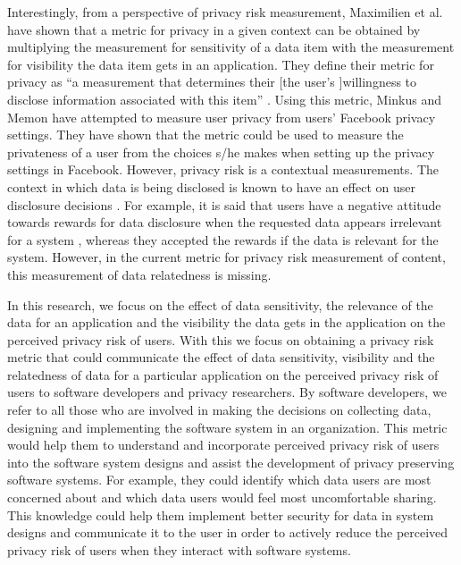 \documentclass[conference]{IEEEtran}
\begin{document}
Interestingly, from a perspective of privacy risk measurement, Maximilien et al. \cite {maximilien2009privacy} have shown that a metric for privacy in a given context can be obtained by multiplying the measurement for sensitivity of a data item with the measurement for visibility the data item gets in an application. They define their metric for privacy as \enquote{a measurement that determines their [the user's ]willingness to disclose information associated with this item} \cite {maximilien2009privacy}. Using this metric, Minkus and Memon \cite{minkus2014scale} have attempted to measure user privacy from users' Facebook privacy settings. They have shown that the metric could be used to measure the privateness of a user from the choices s/he makes when setting up the privacy settings in Facebook. However, privacy risk is a contextual measurements. The context in which data is being disclosed \cite {nissenbaum2009privacy, john2010strangers} is known to have an effect on user disclosure decisions \cite {knijnenburg2013making}. For example, it is said that users have a negative attitude towards rewards for data disclosure when the requested data appears irrelevant for a system \cite {li2010understanding}, whereas they accepted the rewards if the data is relevant for the system. However, in the current metric for privacy risk measurement of content, this measurement of data relatedness is missing.

In this research, we focus on the effect of data sensitivity, the relevance of the data for an application and the visibility the data gets in the application on the perceived privacy risk of users. With this we focus on obtaining a privacy risk metric that could communicate the effect of data sensitivity, visibility and the relatedness of data for a particular application on the perceived privacy risk of users to software developers and privacy researchers. By software developers, we refer to all those who are involved in making the decisions on collecting data, designing and implementing the software system in an organization. This metric would help them to understand and incorporate perceived privacy risk of users into the software system designs and assist the development of privacy preserving software systems. For example, they could identify which data users are most concerned about and which data users would feel most uncomfortable sharing. This knowledge could help them implement better security for data in system designs and communicate it to the user in order to actively reduce the perceived privacy risk of users when they interact with software systems.
\end{document}
